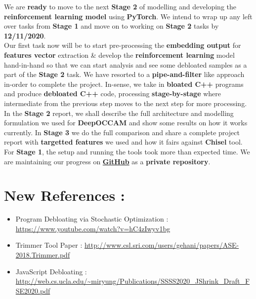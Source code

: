 \documentclass{article} %
\begin{document}
We are \textbf{\color{ao(english)}ready} to move to the next \textbf{Stage 2} of modelling and developing the \textbf{\color{ao(english)} reinforcement learning model} using \textbf{PyTorch}. We intend to wrap up any left over tasks from \textbf{Stage 1} and move on to working on \textbf{Stage 2} tasks by \textbf{\color{blue} 12/11/2020}. \\ 

Our first task now will be to start pre-processing the \textbf{\color{ao(english)} embedding output} for \textbf{\color{ao(english)} features vector} extraction \& develop the \textbf{\color{ao(english)}reinforcement learning} model hand-in-hand so that we can start analysis and see some debloated samples as a part of the \textbf{Stage 2} task. We have resorted to a \textbf{pipe-and-filter} like approach in-order to complete the project. In-sense, we take in \textbf{\color{red} bloated C++} programs and produce \textbf{\color{ao(english)} debloated C++} code, processing \textbf{stage-by-stage} where intermediate from the previous step moves to the next step for more processing. \\ 

In the \textbf{Stage 2} report, we shall describe the full architecture and modelling formulation we used for \textbf{DeepOCCAM} and show some results on how it works currently. In \textbf{Stage 3} we do the full comparison and share a complete project report with \textbf{targetted features} we used and how it fairs against \textbf{Chisel} tool.  For \textbf{Stage 1}, the setup and running the tools took more than expected time. We are maintaining our progress on \textbf{\href{https://github.com/lahiri-phdworks/reinforcedlearning-debloater} {GitHub}} as a \textbf{private repository}.

\section*{New References : }
\begin{itemize}
	\item Program Debloating via Stochastic Optimization : \url{https://www.youtube.com/watch?v=hC4zIwyv1bg}
	\item Trimmer Tool Paper : \url{http://www.csl.sri.com/users/gehani/papers/ASE-2018.Trimmer.pdf}
	\item JavaScript Debloating : \url{http://web.cs.ucla.edu/~miryung/Publications/SSSS2020_JShrink_Draft_FSE2020.pdf}
\end{itemize}
\end{document}

